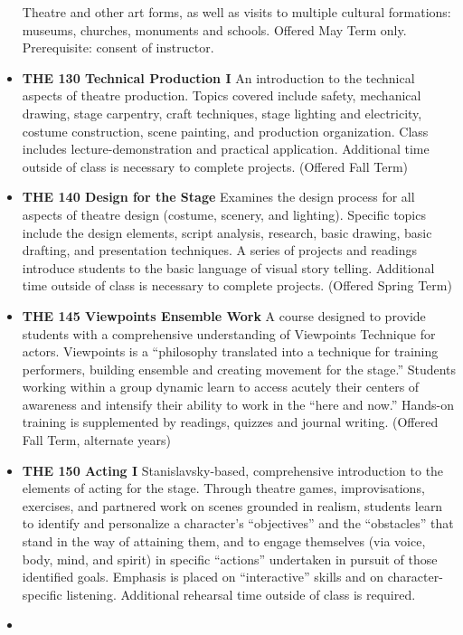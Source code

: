 \documentclass[
  letterpaper,
]{scrbook}
\begin{document}
\begin{itemize}
  Theatre and other art forms, as well as visits to multiple cultural
  formations: museums, churches, monuments and schools. Offered May Term
  only. Prerequisite: consent of instructor.
\item
  \textbf{THE 130 Technical Production I} An introduction to the
  technical aspects of theatre production. Topics covered include
  safety, mechanical drawing, stage carpentry, craft techniques, stage
  lighting and electricity, costume construction, scene painting, and
  production organization. Class includes lecture-demonstration and
  practical application. Additional time outside of class is necessary
  to complete projects. (Offered Fall Term)\\
\item
  \textbf{THE 140 Design for the Stage} Examines the design process for
  all aspects of theatre design (costume, scenery, and lighting).
  Specific topics include the design elements, script analysis,
  research, basic drawing, basic drafting, and presentation techniques.
  A series of projects and readings introduce students to the basic
  language of visual story telling. Additional time outside of class is
  necessary to complete projects. (Offered Spring Term)
\item
  \textbf{THE 145 Viewpoints Ensemble Work} A course designed to provide
  students with a comprehensive understanding of Viewpoints Technique
  for actors. Viewpoints is a ``philosophy translated into a technique
  for training performers, building ensemble and creating movement for
  the stage.'' Students working within a group dynamic learn to access
  acutely their centers of awareness and intensify their ability to work
  in the ``here and now.'' Hands-on training is supplemented by
  readings, quizzes and journal writing. (Offered Fall Term, alternate
  years)\\
\item
  \textbf{THE 150 Acting I} Stanislavsky-based, comprehensive
  introduction to the elements of acting for the stage. Through theatre
  games, improvisations, exercises, and partnered work on scenes
  grounded in realism, students learn to identify and personalize a
  character's ``objectives'' and the ``obstacles'' that stand in the way
  of attaining them, and to engage themselves (via voice, body, mind,
  and spirit) in specific ``actions'' undertaken in pursuit of those
  identified goals. Emphasis is placed on ``interactive'' skills and on
  character-specific listening. Additional rehearsal time outside of
  class is required.
\item

\end{itemize}
\end{document}
